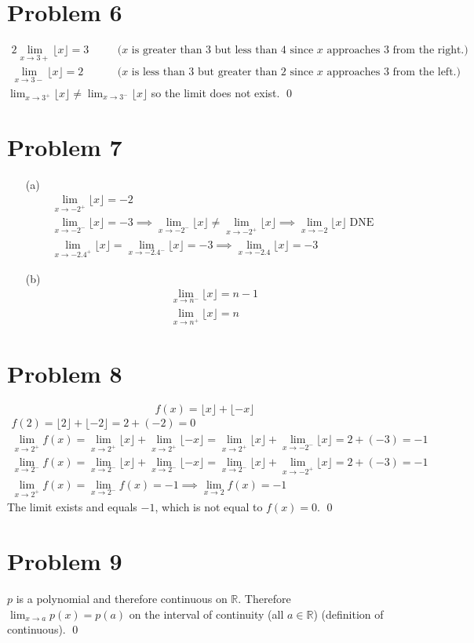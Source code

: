 \documentclass{article}
\newcommand{\floor}[1]{\lfloor #1 \rfloor}
\newcommand{\problem}[1]{\section*{Problem #1}}
\DeclareMathOperator{\DNE}{DNE}
\begin{document}
\problem{6}
\begin{alignat*}{2}
	\lim_{x\to3+}\floor{x}=3 &\quad& \text{($x$ is greater than $3$ but less than $4$ since $x$ approaches $3$ from the right.)} \\
	\lim_{x\to3-}\floor{x}=2 && \text{($x$ is less than $3$ but greater than $2$ since $x$ approaches $3$ from the left.)}
\end{alignat*}
$\displaystyle \lim_{x\to3^+}\floor{x}\neq\lim_{x\to3^-}\floor{x}$ so the limit does not exist. \qed

\problem{7}
\begin{itemize}
	\item[(a)]
	\begin{gather*}
		\lim_{x\to-2^+}\floor{x}=\boxed{-2} \\
		\lim_{x\to-2^-}\floor{x}=-3\implies\lim_{x\to-2^-}\floor{x}\neq\lim_{x\to-2^+}\floor{x}\implies\boxed{\lim_{x\to-2}\floor{x}\DNE} \\
		\lim_{x\to-2.4^+}\floor{x}=\lim_{x\to-2.4^-}\floor{x}=-3\implies\lim_{x\to-2.4}\floor{x}=\boxed{-3}
	\end{gather*}

	\item[(b)]
	\begin{gather*}
		\lim_{x\to n^-}\floor{x}=\boxed{n-1} \\
		\lim_{x\to n^+}\floor{x}=\boxed{n}
	\end{gather*}
\end{itemize}

\problem{8}
\begin{equation*}
	f(x)=\floor{x}+\floor{-x}
\end{equation*}
\begin{gather*}
	f(2)=\floor{2}+\floor{-2}=2+(-2)=0 \\
	\lim_{x\to2^+}f(x)=\lim_{x\to2^+}\floor{x}+\lim_{x\to2^+}\floor{-x}=\lim_{x\to2^+}\floor{x}+\lim_{x\to-2^-}\floor{x}=2+(-3)=-1 \\
	\lim_{x\to2^-}f(x)=\lim_{x\to2^-}\floor{x}+\lim_{x\to2^-}\floor{-x}=\lim_{x\to2^-}\floor{x}+\lim_{x\to-2^+}\floor{x}=2+(-3)=-1 \\
	\lim_{x\to2^+}f(x)=\lim_{x\to2^-}f(x)=-1\implies\lim_{x\to2}f(x)=-1
\end{gather*}
The limit exists and equals $-1$, which is not equal to $f(x)=0$. \qed

\problem{9}
$p$ is a polynomial and therefore continuous on $\mathbb{R}$. Therefore $\displaystyle \lim_{x\to a}p(x)=p(a)$ on the interval of continuity (all $a\in\mathbb{R}$) (definition of continuous). \qed
\end{document}
